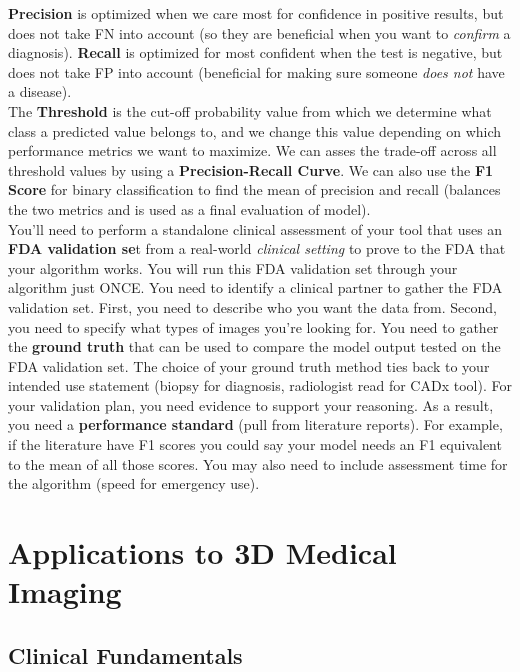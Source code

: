 \documentclass[11pt, a4paper]{article}
\begin{document}
	\textbf{Precision} is optimized when we care most for confidence in positive results, but does not take FN into account (so they are beneficial when you want to \textit{confirm} a diagnosis). \textbf{Recall} is optimized for most confident when the test is negative, but does not take FP into account (beneficial for making sure someone \textit{does not} have a disease). \vspace*{3mm}\\
	The \textbf{Threshold} is the cut-off probability value from which we determine what class a predicted value belongs to, and we change this value depending on which performance metrics we want to maximize. We can asses the trade-off across all threshold values by using a \textbf{Precision-Recall Curve}. We can also use the \textbf{F1 Score} for binary classification to find the mean of precision and recall (balances the two metrics and is used as a final evaluation of model). \vspace*{3mm}\\
	You'll need to perform a standalone clinical assessment of your tool that uses an \textbf{FDA validation se}t from a real-world \textit{clinical setting} to prove to the FDA that your algorithm works. You will run this FDA validation set through your algorithm just ONCE. You need to identify a clinical partner to gather the FDA validation set. First, you need to describe who you want the data from. Second, you need to specify what types of images you’re looking for. You need to gather the \textbf{ground truth} that can be used to compare the model output tested on the FDA validation set. The choice of your ground truth method ties back to your intended use statement (biopsy for diagnosis, radiologist read for CADx tool). For your validation plan, you need evidence to support your reasoning. As a result, you need a \textbf{performance standard} (pull from literature reports). For example, if the literature have F1 scores you could say your model needs an F1 equivalent to the mean of all those scores. You may also need to include assessment time for the algorithm (speed for emergency use). \newpage
	

	\section{Applications to 3D Medical Imaging}
	\subsection{Clinical Fundamentals}
	
	
	
	
	
\end{document}
